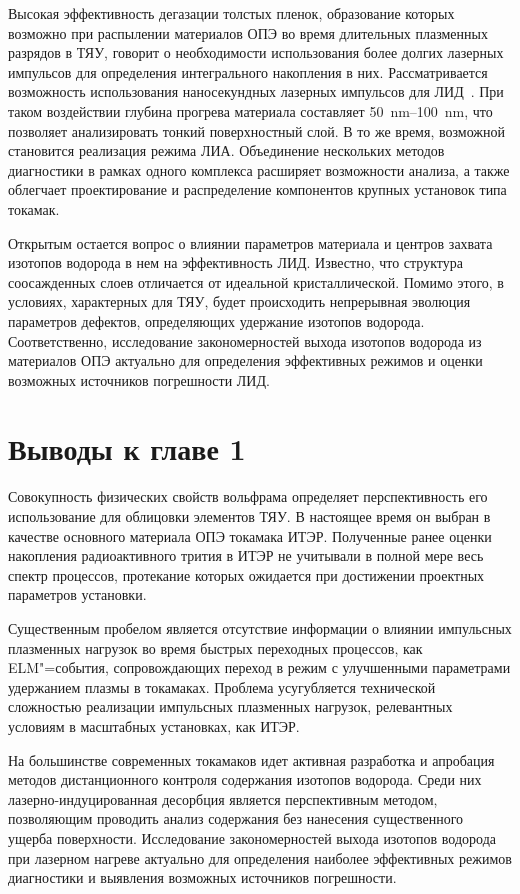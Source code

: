 Высокая эффективность дегазации толстых пленок, образование которых возможно при распылении материалов ОПЭ во время длительных плазменных разрядов в ТЯУ, говорит о необходимости использования более долгих лазерных импульсов для определения интегрального накопления в них. Рассматривается возможность использования наносекундных лазерных импульсов для ЛИД~\cite{Medvedev2024, Gasparyan2021, Efimov2024}. При таком воздействии глубина прогрева материала составляет \SIrange{50}{100}{\nano\meter}, что позволяет анализировать тонкий поверхностный слой. В то же время, возможной становится реализация режима ЛИА. Объединение нескольких методов диагностики в рамках одного комплекса расширяет возможности анализа, а также облегчает проектирование и распределение компонентов крупных установок типа токамак.

Открытым остается вопрос о влиянии параметров материала и центров захвата изотопов водорода в нем на эффективность ЛИД. Известно, что структура соосажденных слоев отличается от идеальной кристаллической. Помимо этого, в условиях, характерных для ТЯУ, будет происходить непрерывная эволюция параметров дефектов, определяющих удержание изотопов водорода. Соответственно, исследование закономерностей выхода изотопов водорода из материалов ОПЭ актуально для определения эффективных режимов и оценки возможных источников погрешности ЛИД. 

\section{Выводы к главе 1}

Совокупность физических свойств вольфрама определяет перспективность его использование для облицовки элементов ТЯУ. В настоящее время он выбран в качестве основного материала ОПЭ токамака ИТЭР. Полученные ранее оценки накопления радиоактивного трития в ИТЭР не учитывали в полной мере весь спектр процессов, протекание которых ожидается при достижении проектных параметров установки. 

Существенным пробелом является отсутствие информации о влиянии импульсных плазменных нагрузок во время быстрых переходных процессов, как ELM"=события, сопровождающих переход в режим с улучшенными параметрами удержанием плазмы в токамаках. Проблема усугубляется технической сложностью реализации импульсных плазменных нагрузок, релевантных условиям в масштабных установках, как ИТЭР. 

На большинстве современных токамаков идет активная разработка и апробация методов дистанционного контроля содержания изотопов водорода. Среди них лазерно-индуцированная десорбция является перспективным методом, позволяющим проводить анализ содержания без нанесения существенного ущерба поверхности. Исследование закономерностей выхода изотопов водорода при лазерном нагреве актуально для определения наиболее эффективных режимов диагностики и выявления возможных источников погрешности.


